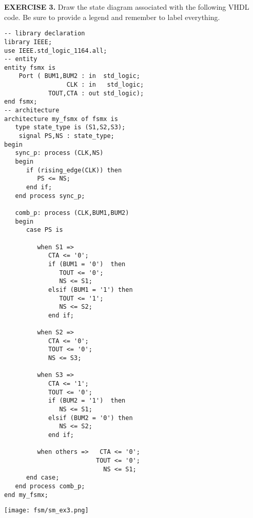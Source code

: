 \vspace{20pt}
\noindent
\begin{minipage}{1\textwidth}
\textbf{EXERCISE 3.}
Draw the state diagram associated with the following VHDL code. Be sure to provide a legend and remember to label everything.
\end{minipage}
\begin{minipage}{0.66\textwidth}
\vspace{10px}
\begin{lstlisting}
-- library declaration
library IEEE;
use IEEE.std_logic_1164.all;
-- entity
entity fsmx is
    Port ( BUM1,BUM2 : in  std_logic;
                 CLK : in   std_logic;
            TOUT,CTA : out std_logic);
end fsmx;
-- architecture
architecture my_fsmx of fsmx is
   type state_type is (S1,S2,S3);
	signal PS,NS : state_type;
begin
   sync_p: process (CLK,NS)
   begin
      if (rising_edge(CLK)) then
         PS <= NS;
      end if;
   end process sync_p;

   comb_p: process (CLK,BUM1,BUM2)
   begin
      case PS is

         when S1 =>
            CTA <= '0';
            if (BUM1 = '0')  then
               TOUT <= '0';
               NS <= S1;
            elsif (BUM1 = '1') then
               TOUT <= '1';
               NS <= S2;
            end if;

         when S2 =>
            CTA <= '0';
            TOUT <= '0';
            NS <= S3;

         when S3 =>
            CTA <= '1';
            TOUT <= '0';
            if (BUM2 = '1')  then
               NS <= S1;
            elsif (BUM2 = '0') then
               NS <= S2;
            end if;

         when others =>   CTA <= '0';
                         TOUT <= '0';
                           NS <= S1;
      end case;
   end process comb_p;
end my_fsmx;
\end{lstlisting}
\end{minipage}
\begin{minipage}{0.33\textwidth}
\texttt{[image: fsm/sm\_ex3.png]}
\vspace{250px}
\end{minipage}

